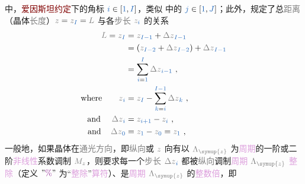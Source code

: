  中，\textcolor{Maroon}{爱因斯坦约定}下的\textcolor{NavyBlue}{角标} $\textcolor{NavyBlue}{i} \in \left[ \textcolor{NavyBlue}{1}, \textcolor{NavyBlue}{I} \right]$，类似  中的 $\textcolor{NavyBlue}{j} \in \left[ \textcolor{NavyBlue}{1}, \textcolor{NavyBlue}{J} \right]$；此外，规定了总\textcolor{gray}{距离}（\textcolor{PineGreen}{晶体}\textcolor{gray}{长度}）$\mathcolor{gray}{z} = \mathcolor{gray}{z_{\textcolor{NavyBlue}{I}}} = \mathcolor{gray}{L}$ 与各\textcolor{gray}{步长} $\mathcolor{gray}{z_{\textcolor{NavyBlue}{i}}}$ 的关系
\begin{subequations} \label{eq:iterate-z}
	\begin{align}
		\mathcolor{gray}{L} = \mathcolor{gray}{z_{\textcolor{NavyBlue}{I}}} &= \mathcolor{gray}{z_{\textcolor{NavyBlue}{I-1}}} + {\mathcolor{gray}{\Delta z}}_{\textcolor{NavyBlue}{I-1}} \label{eq:iterate-z-a} \\ 
		&= \left( \mathcolor{gray}{z_{\textcolor{NavyBlue}{I-2}}} + {\mathcolor{gray}{\Delta z}}_{\textcolor{NavyBlue}{I-2}} \right) + {\mathcolor{gray}{\Delta z}}_{\textcolor{NavyBlue}{I-1}} \label{eq:iterate-z-b} \\ 
		&= \sum^{\textcolor{NavyBlue}{I}}_{\textcolor{NavyBlue}{i}=\textcolor{NavyBlue}{1}} {\mathcolor{gray}{\Delta z}}_{\textcolor{NavyBlue}{i-1}} \label{eq:iterate-z-c} ~, \\ 
		\text{where}\ \ \ \ \ \ {\mathcolor{gray}{z}}_{\textcolor{NavyBlue}{i}} &= \mathcolor{gray}{z_{\textcolor{NavyBlue}{I}}} - \sum^{\textcolor{NavyBlue}{I-1}}_{\textcolor{NavyBlue}{k}=\textcolor{NavyBlue}{i}} {\mathcolor{gray}{\Delta z}}_{\textcolor{NavyBlue}{k}} \label{eq:iterate-z-d} ~,\\ 
		\text{and}\ \ \ \ {\mathcolor{gray}{\Delta z}}_{\textcolor{NavyBlue}{i}} &= \mathcolor{gray}{z_{\textcolor{NavyBlue}{i+1}}} - \mathcolor{gray}{z_{\textcolor{NavyBlue}{i}}} \label{eq:iterate-z-e} ~,\\ 
		\text{and}\ \ \ \ \! {\mathcolor{gray}{\Delta z}}_{\textcolor{NavyBlue}{0}} &= \mathcolor{gray}{z_{\textcolor{NavyBlue}{1}}} - \mathcolor{gray}{z_{\textcolor{NavyBlue}{0}}} = \mathcolor{gray}{z_{\textcolor{NavyBlue}{1}}} \label{eq:iterate-z-f} ~,
	\end{align}
\end{subequations}
一般地，如果\textcolor{PineGreen}{晶体}在\textcolor{gray}{通光方向}，即\textcolor{gray}{纵向}或 $\mathcolor{gray}{z}$ 向有以 $\mathcolor{gray}{\Lambda_{\symup{z}}}$ 为\textcolor{Plum}{周期}的一阶或二阶\textcolor{Plum}{非线性}系数\textcolor{NavyBlue}{调制} $\mathcolor{gray}{M_z}$，则要求每一个\textcolor{gray}{步长} ${\mathcolor{gray}{\Delta z}}_{\textcolor{NavyBlue}{i}}$ 都被\textcolor{gray}{纵向}\textcolor{NavyBlue}{调制}\textcolor{Plum}{周期} $\mathcolor{gray}{\Lambda_{\symup{z}}}$ \textcolor{Plum}{整除}（定义 $"\textcolor{Plum}{\%}"$ 为“\textcolor{Plum}{整除}”\textcolor{Plum}{算符}）、是\textcolor{Plum}{周期} $\mathcolor{gray}{\Lambda_{\symup{z}}}$ 的\textcolor{Plum}{整数倍}，即
